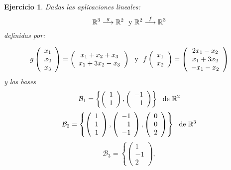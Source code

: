 \documentclass{amsart}
\newtheorem{ejer}{Ejercicio}
\def\r{\mathbb{R}}
\begin{document}
\begin{ejer} Dadas las aplicaciones lineales:
\[\r ^3  \buildrel g \over{\longrightarrow } \r ^2  \ \ \hbox{y} \ \r ^2  \buildrel f \over{\longrightarrow } \r ^3 \] definidas por:

\[g \left( \begin{array}{c}
x_1 \\ x_2 \\ x_3             
\end{array} \right) = \left( \begin{array}{c}
x_1+x_2+x_3 \\ x_1+3x_2-x_3             
\end{array} \right)  \ \ \hbox{y} \ \ f \left( \begin{array}{c}
x_1 \\ x_2             
\end{array} \right) = \left( \begin{array}{c}
2x_1-x_2 \\ x_1+3x_2 \\ -x_1-x_2             
\end{array} \right) \] y las bases
\[\mathcal{B}_1 = \left\lbrace \left( \begin{array}{r}
1 \\ 1            
\end{array} \right), 
\left( \begin{array}{r}
-1 \\ 1            
\end{array} \right) \right\rbrace \ \ \hbox{de}  \ \r ^2 \]
\[\mathcal{B}_2 = \left\lbrace \left( \begin{array}{r}
1 \\ 1 \\ 1            
\end{array} \right), 
\left( \begin{array}{r}
-1 \\ 1 \\ -1           
\end{array} \right), 
\left( \begin{array}{r}
0 \\ 0 \\ 2         
\end{array} \right) \right\rbrace \ \ \hbox{de}  \ \r ^3 \]
\[\mathcal{B}_3 = \left\lbrace \left( \begin{array}{r}
1 \\ -1 \\ 2            
\end{array} \right), 
\]
\end{ejer}
\end{document}
